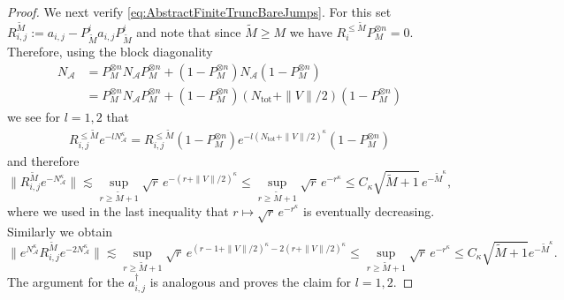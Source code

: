 \documentclass[11pt]{amsart}
\newcommand{\1}{\mathbbm{1}}
\newcommand{\NA}{N_{\mathcal{A}}}
\newcommand{\Ntot}{N_{\operatorname{tot}}}
\theoremstyle{plain}
\theoremstyle{definition}
\theoremstyle{remark}
\numberwithin{equation}{section}
\begin{document}
\begin{proof}
We next verify \eqref{eq:AbstractFiniteTruncBareJumps}. For this 
set \(R^{\widetilde M}_{i,j}:=a_{i,j}-P^{i}_{\widetilde M}a_{i,j} P^{i}_{\widetilde M}\) and note that since $\widetilde M\ge M$ we have $R^{\le \widetilde M}_{i}P^{\otimes n}_{M} = 0.$
Therefore, using the block diagonality \begin{align*}
\NA &= P^{\otimes n}_{M}\NA P^{\otimes n}_{M} + (1-P^{\otimes n}_{M})\NA (1-P^{\otimes n}_{M}) \\&= P^{\otimes n}_{M}\NA P^{\otimes n}_{M} +(1-P^{\otimes n}_{M}) (\Ntot+\|V\|/2) (1-P^{\otimes n}_{M})
\end{align*}
we see for $l=1,2$ that 
\begin{align}
    R^{\le \widetilde M}_{i,j} e^{-l\NA^{\kappa}} = R^{\le \widetilde M}_{i,j} (1-P^{\otimes n}_{M})e^{-l(\Ntot+\|V\|/2)^{\kappa}}(1-P^{\otimes n}_{M}) 
\end{align}
and therefore
\[
\|R^{\widetilde M}_{i,j} e^{-N_{\mathcal A}^\kappa}\|
\lesssim \sup_{r\ge \widetilde M+1}\sqrt r\,e^{-(r+\|V\|/2)^\kappa} \le \sup_{r\ge \widetilde M+1}\sqrt r\,e^{-r^\kappa} \le C_{\kappa} \sqrt{\widetilde M+1}\, e^{-\widetilde M^\kappa},
\]
where we used in the last inequality that \(r\mapsto \sqrt r\,e^{-r^\kappa}\) is eventually decreasing.  Similarly we obtain
\[
\|e^{\NA^\kappa}R^{\widetilde M}_{i,j} e^{-2N_{\mathcal A}^\kappa}\|
\lesssim \sup_{r\ge \widetilde M+1}\sqrt r\,e^{(r-1+\|V\|/2)^\kappa-2(r+\|V\|/2)^\kappa} \le \sup_{r\ge \widetilde M+1}\sqrt r\,e^{-r^\kappa} \le C_{\kappa} \sqrt{\widetilde M+1} e^{-\widetilde M^\kappa}.
\]
The argument for the $a_{i,j}^{\dagger}$ is analogous and proves the claim for \(l=1,2\).



\end{proof}
\end{document}
